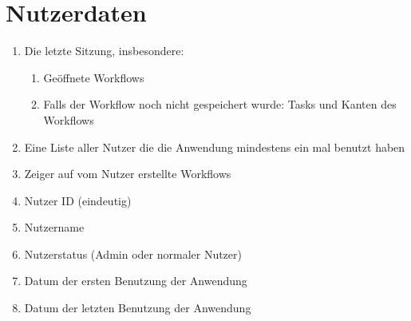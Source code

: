     \section{Nutzerdaten}
        \begin{enumerate}[font={\bfseries}, label={PD3\arabic*}0, wide=0pt, labelindent=1em, leftmargin=*]
            \item \label{sessionRestore} Die letzte Sitzung, insbesondere:
                \begin{enumerate}[font={\bfseries}, label={PD31\arabic*}, wide=0pt, labelindent=1em, leftmargin=*]
                    \item Geöffnete Workflows
                    \item Falls der Workflow noch nicht gespeichert wurde: Tasks und Kanten des Workflows
                \end{enumerate}
            \item \label{allUsers} Eine Liste aller Nutzer die die Anwendung mindestens ein mal benutzt haben
            \item \label{erstellteWorkflowsProNutzer} Zeiger auf vom Nutzer erstellte Workflows
            \item \label{nutzerID} Nutzer ID (eindeutig)
            \item \label{Nutzername} Nutzername
            \item \label{Nutzerstatus} Nutzerstatus (Admin oder normaler Nutzer)
            \item \label{1stLogin} Datum der ersten Benutzung der Anwendung
            \item \label{lastLogin} Datum der letzten Benutzung der Anwendung
        \end{enumerate}
